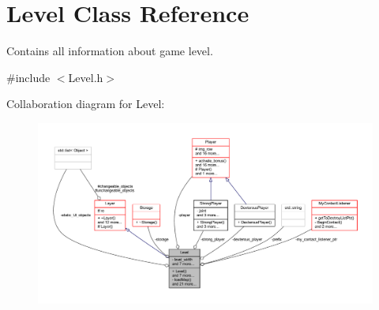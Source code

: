 \hypertarget{class_level}{}\section{Level Class Reference}
\label{class_level}


Contains all information about game level.  




{\ttfamily \#include $<$Level.\+h$>$}



Collaboration diagram for Level\+:
\nopagebreak
\begin{figure}[H]
\begin{center}
\leavevmode
\includegraphics[width=350pt]{class_level__coll__graph}
\end{center}
\end{figure}
